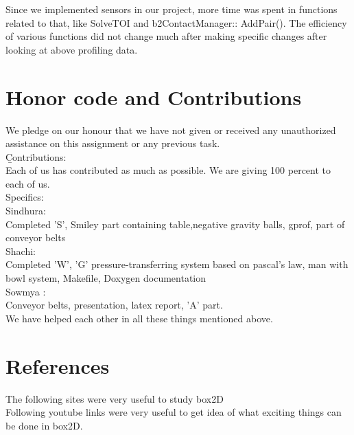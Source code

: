 \documentclass{report}
\begin{document}
Since we implemented sensors in our project, more time was spent in functions related to that, like SolveTOI and b2ContactManager:: AddPair().
The efficiency of various functions did not change much after making specific changes after looking at above profiling data. 
\newpage
\section{Honor code and Contributions}
We pledge on our honour that we have not given or received any unauthorized assistance on this assignment or any previous task.\\

{\b Contributions}:\\
Each of us has contributed as much as possible. We are giving 100 percent to each of us.\\
Specifics:\\

Sindhura: \\
Completed 'S', Smiley part containing table,negative gravity balls, gprof, part of conveyor belts\\

Shachi:\\
Completed 'W', 'G' pressure-transferring system based on pascal's law, man with bowl system, Makefile, Doxygen documentation\\

Sowmya : \\
Conveyor belts, presentation, latex report, 'A' part.\\

We have helped each other in all these things mentioned above.\\
\newpage
\section{References}

The following sites were very useful to study box2D
\cite{DUMMY:1}
\cite{DUMMY:2}\\
Following youtube links were very useful to get idea of what exciting things can be done in box2D.
\cite{DUMMY:3}
\cite{DUMMY:4}
\cite{DUMMY:5}
\cite{DUMMY:6}



\newpage

 

\end{document}
